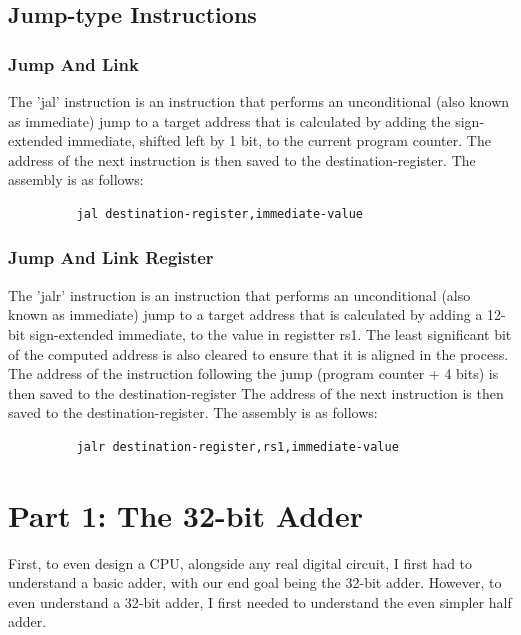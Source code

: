 \documentclass{article}
\begin{document}
\subsection{Jump-type Instructions}

\subsubsection{Jump And Link}
\qquad
The 'jal' instruction is an instruction that performs an unconditional (also known as immediate) jump to a target address that is calculated by adding the sign-extended immediate, shifted left by 1 bit, to the current program counter. The address of the next instruction is then saved to the destination-register. The assembly is as follows:
\begin{figure}[!htbp]
    \centering
    \begin{verbatim}
    jal destination-register,immediate-value
    \end{verbatim}
\end{figure}\newline

\subsubsection{Jump And Link Register}
\qquad
The 'jalr' instruction is an instruction that performs an unconditional (also known as immediate) jump to a target address that is calculated by adding a 12-bit sign-extended immediate, to the value in registter rs1. The least significant bit of the computed address is also cleared to ensure that it is aligned in the process. The address of the instruction following the jump (program counter + 4 bits) is then saved to the destination-register The address of the next instruction is then saved to the destination-register. The assembly is as follows:
\begin{figure}[!htbp]
    \centering
    \begin{verbatim}
    jalr destination-register,rs1,immediate-value
    \end{verbatim}
\end{figure}\newline



\newpage
\section{Part 1: The 32-bit Adder}
\qquad
First, to even design a CPU, alongside any real digital circuit, I first had to understand a basic adder, with our end goal being the 32-bit adder. However, to even understand a 32-bit adder, I first needed to understand the even simpler half adder.
\end{document}
